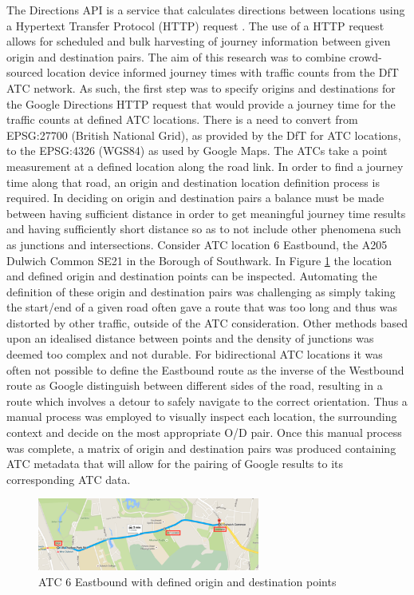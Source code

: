 \documentclass{CUP-JNL-DCE}
\begin{document}
The Directions API is a service that calculates directions between locations using a Hypertext Transfer  Protocol (HTTP) request \citep{Google_directions_api}. The use of a HTTP request allows for scheduled and bulk harvesting of journey information between given origin and destination pairs. The aim of this research was to combine crowd-sourced location device informed journey times with traffic counts from the DfT ATC network. As such, the first step was to specify origins and destinations for the Google Directions HTTP request that would provide a journey time for the traffic counts at defined ATC locations. There is a need to convert from EPSG:27700 (British National Grid), as provided by the DfT for ATC locations, to the EPSG:4326 (WGS84) as used by Google Maps. The ATCs take a point measurement at a defined location along the road link. In order to find a journey time along that road, an origin and destination location definition process is required. In deciding on origin and destination pairs a balance must be made between having sufficient distance in order to get meaningful journey time results and having sufficiently short distance so as to not include other phenomena such as junctions and intersections. Consider ATC location 6 Eastbound, the A205 Dulwich Common SE21 in the Borough of Southwark. In Figure \ref{fig:Picture3.24} the location and defined origin and destination points can be inspected. Automating the definition of these origin and destination pairs was challenging as simply taking the start/end of a given road often gave a route that was too long and thus was distorted by other traffic, outside of the ATC consideration. Other methods based upon an idealised distance between points and the density of junctions was deemed too complex and not durable. For bidirectional ATC locations it was often not possible to define the Eastbound route as the inverse of the Westbound route as Google distinguish between different sides of the road, resulting in a route which involves a detour to safely navigate to the correct orientation.  Thus a manual process was employed to visually inspect each location, the surrounding context and decide on the most appropriate O/D pair. Once this manual process was complete, a matrix of origin and destination pairs was produced containing ATC metadata that will allow for the pairing of Google results to its corresponding ATC data. 

\begin{figure}[htbp!] 
	\centering    
	\includegraphics[width=0.65\textwidth]{Picture24}
	\caption[ATC 6 Eastbound with defined origin and destination points \citep{google_maps}]{ATC 6 Eastbound with defined origin and destination points \citep{google_maps}}
	\label{fig:Picture3.24}
\end{figure}
\end{document}
